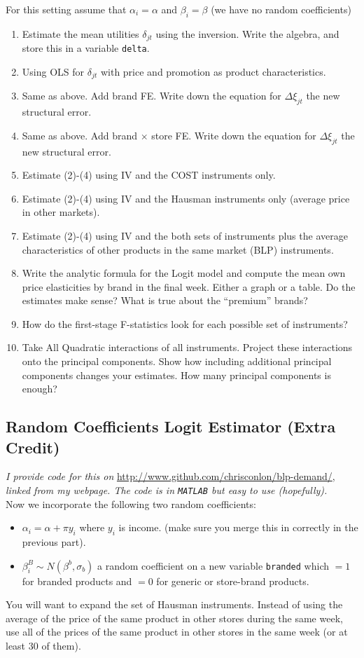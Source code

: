 \documentclass[11pt,letterpaper]{article}
\begin{document}
For this setting assume that $\alpha_i = \alpha$ and $\beta_i = \beta$ (we have no random coefficients)
\begin{enumerate}
\item Estimate the mean utilities $\delta_{jt}$ using the inversion. Write the algebra, and store this in a variable \texttt{delta}.
\item Using OLS for  $\delta_{jt}$ with price and promotion as product characteristics.
\item Same as above. Add brand FE. Write down the equation for $\Delta \xi_{jt}$ the new structural error.
\item Same as above. Add brand $\times$ store FE.  Write down the equation for $\Delta \xi_{jt}$ the new structural error.
\item Estimate (2)-(4) using IV and the COST instruments only.
\item Estimate (2)-(4) using IV and the Hausman instruments only (average price in other markets).
\item Estimate (2)-(4) using IV and the both sets of instruments plus the average characteristics of other products in the same market (BLP) instruments.
\item Write the analytic formula for the Logit model and compute the mean own price elasticities by brand in the final week. Either a graph or a table. Do the estimates make sense? What is true about the ``premium'' brands?
\item How do the first-stage F-statistics look for each possible set of instruments?
\item Take All Quadratic interactions of all instruments. Project these interactions onto the principal components. Show how including additional principal components changes your estimates. How many principal components is enough?
\end{enumerate}

\subsection*{Random Coefficients Logit Estimator (Extra Credit)} 
\textit{I provide code for this on}  \url{http://www.github.com/chrisconlon/blp-demand/}, \textit{linked from my webpage. The code is in \texttt{MATLAB} but easy to use (hopefully).} \\

\noindent Now we incorporate the following two random coefficients:
\begin{itemize}
\item $\alpha_i = \alpha + \pi y_i$ where $y_i$ is income. (make sure you merge this in correctly in the previous part).
\item $\beta_{i}^B \sim N(\beta^b,\sigma_b)$ a random coefficient on a new variable \texttt{branded} which $=1$ for branded products and $=0$ for generic or store-brand products.
\end{itemize}
You will want to expand the set of Hausman instruments. Instead of using the average of the price of the same product in other stores during the same week, use all of the prices of the same product in other stores in the same week (or at least 30 of them).\\
\end{document}
